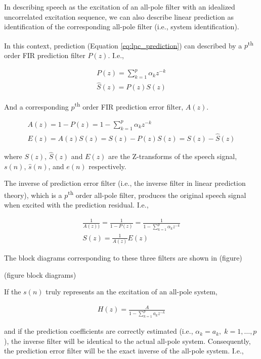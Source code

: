 In describing speech as the excitation of an all-pole filter with an idealized uncorrelated excitation sequence, we can also describe linear prediction as identification of the corresponding all-pole filter (i.e., system identification). 

In this context, prediction (Equation \ref{eq:lpc_prediction}) can described by a $p$\textsuperscript{th} order FIR prediction filter $P(z)$. I.e.,

\begin{eqnarray}
	P(z) = \sum_{k=1}^{p}\alpha_k z^{-k} \\
	\hat{S}(z) = P(z)S(z)
\end{eqnarray}

\noindent
And a corresponding $p$\textsuperscript{th} order FIR prediction error filter, $A(z)$.

\begin{eqnarray}
	A(z) = 1 - P(z) = 1 - \sum_{k=1}^{p}\alpha_k z^{-k} \\
	E(z) = A(z)S(z) = S(z) - P(z)S(z) = S(z) - \hat{S}(z)
\end{eqnarray}

\noindent
where $S(z)$, $\hat{S}(z)$ and $E(z)$ are the Z-transforms of the speech signal, $s(n)$, $\hat{s}(n)$, and $e(n)$ respectively.

The inverse of prediction error filter (i.e., the inverse filter in linear prediction theory), which is a $p$\textsuperscript{th} order all-pole filter, produces the original speech signal when excited with the prediction residual. I.e.,

\begin{eqnarray}
	\frac{1}{A(z))} = \frac{1}{1 - P(z)} = \frac{1}{1 - \sum_{k=1}^{p}\alpha_k z^{-k}} \\
	S(z) = \frac{1}{A(z)} E(z)
\end{eqnarray}

The block diagrams corresponding to these three filters are shown in (figure)

(figure block diagrams)

If the $s(n)$ truly represents an the excitation of an all-pole system,  

\begin{eqnarray}
	H(z) = \frac{A}{1 - \sum_{k=1}^{p}a_k z^{-k}}
\end{eqnarray}

\noindent
and if the prediction coefficients are correctly estimated (i.e., $\alpha_k=a_k, \; k=1,\dots,p$), the inverse filter will be identical to the actual all-pole system. Consequently, the prediction error filter will be the exact inverse of the all-pole system. I.e.,

